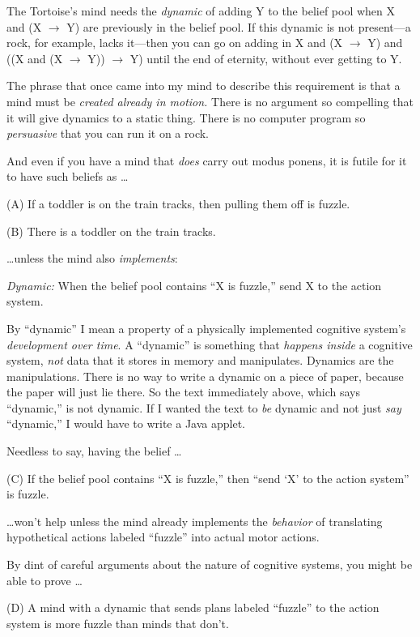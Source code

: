 {
 The Tortoise's mind needs the \textit{dynamic} of
adding Y to the belief pool when X and (X $\rightarrow $ Y) are
previously in the belief pool. If this dynamic is not present---a rock,
for example, lacks it---then you can go on adding in X and (X
$\rightarrow $ Y) and ((X and (X $\rightarrow $ Y)) $\rightarrow $ Y)
until the end of eternity, without ever getting to Y.}

{
 The phrase that once came into my mind to describe this
requirement is that a mind must be \textit{created already in motion.}
There is no argument so compelling that it will give dynamics to a
static thing. There is no computer program so \textit{persuasive} that
you can run it on a rock.}

{
 And even if you have a mind that \textit{does} carry out modus
ponens, it is futile for it to have such beliefs as \ldots}

{
 (A) If a toddler is on the train tracks, then pulling them off is
fuzzle.}

{
 (B) There is a toddler on the train tracks.}

{
 \ldots unless the mind also \textit{implements}:}

{
 \textit{Dynamic:} When the belief pool contains
``X is fuzzle,'' send X to the
action system.}

{
 By ``dynamic'' I mean a
property of a physically implemented cognitive system's
\textit{development over time}. A
``dynamic'' is something that
\textit{happens inside} a cognitive system, \textit{not} data that it
stores in memory and manipulates. Dynamics are the manipulations. There
is no way to write a dynamic on a piece of paper, because the paper
will just lie there. So the text immediately above, which says
``dynamic,'' is not dynamic. If I
wanted the text to \textit{be} dynamic and not just \textit{say}
``dynamic,'' I would have to write a
Java applet.}

{
 Needless to say, having the belief \ldots}

{
 (C) If the belief pool contains ``X is
fuzzle,'' then ``send
`X' to the action
system'' is fuzzle.}

{
 \ldots won't help unless the mind already
implements the \textit{behavior} of translating hypothetical actions
labeled ``fuzzle'' into actual motor
actions.}

{
 By dint of careful arguments about the nature of cognitive
systems, you might be able to prove \ldots}

{
 (D) A mind with a dynamic that sends plans labeled
``fuzzle'' to the action system is
more fuzzle than minds that don't.}

